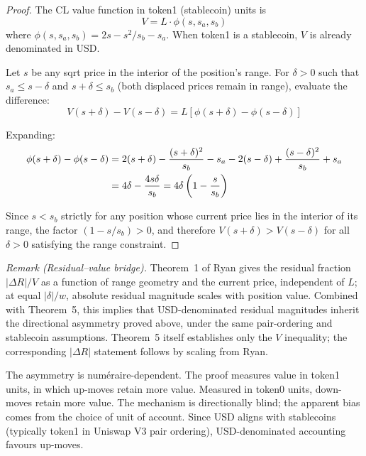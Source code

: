 \documentclass[11pt,a4paper]{article}
\theoremstyle{definition}
\begin{document}
\begin{proof}
The CL value function in token1 (stablecoin) units \cite{ryan2026a} is
\begin{equation}
V = L \cdot \phi(s, s_a, s_b)
\end{equation}
where $\phi(s, s_a, s_b) = 2s - s^2/s_b - s_a$. When token1 is a stablecoin, $V$ is already denominated in USD.

Let $s$ be any sqrt price in the interior of the position's range. For $\delta > 0$ such that $s_a \leq s - \delta$ and $s + \delta \leq s_b$ (both displaced prices remain in range), evaluate the difference:
\begin{equation}
V(s + \delta) - V(s - \delta) = L\left[\phi(s + \delta) - \phi(s - \delta)\right]
\end{equation}

Expanding:
\begin{align}
\phi(s + \delta) - \phi(s - \delta) &= 2(s + \delta) - \frac{(s + \delta)^2}{s_b} - s_a - 2(s - \delta) + \frac{(s - \delta)^2}{s_b} + s_a \notag \\
&= 4\delta - \frac{4s\delta}{s_b} = 4\delta\left(1 - \frac{s}{s_b}\right)
\end{align}

Since $s < s_b$ strictly for any position whose current price lies in the interior of its range, the factor $(1 - s/s_b) > 0$, and therefore $V(s + \delta) > V(s - \delta)$ for all $\delta > 0$ satisfying the range constraint.
\end{proof}

\noindent\textit{Remark (Residual--value bridge).} Theorem~1 of Ryan\cite{ryan2026a} gives the residual fraction $|\Delta R|/V$ as a function of range geometry and the current price, independent of $L$; at equal $|\delta|/w$, absolute residual magnitude scales with position value. Combined with Theorem~5, this implies that USD-denominated residual magnitudes inherit the directional asymmetry proved above, under the same pair-ordering and stablecoin assumptions. Theorem~5 itself establishes only the $V$ inequality; the corresponding $|\Delta R|$ statement follows by scaling from Ryan\cite{ryan2026a}.

The asymmetry is numéraire-dependent. The proof measures value in token1 units, in which up-moves retain more value. Measured in token0 units, down-moves retain more value. The mechanism is directionally blind; the apparent bias comes from the choice of unit of account. Since USD aligns with stablecoins (typically token1 in Uniswap V3 pair ordering), USD-denominated accounting favours up-moves.
\end{document}
